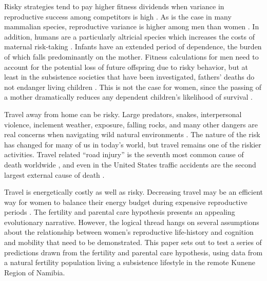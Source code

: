 Risky strategies tend to pay higher fitness dividends when variance in reproductive success among competitors is high \citep{clutton1991sexual, clutton2007sexual, wilson1985competitiveness}.  As is the case in many mammalian species, reproductive variance is higher among men than women \citep{betzig2012means}.  In addition, humans are a particularly altricial species which increases the costs of maternal risk-taking  \citep{campbell1999staying}.  Infants have an extended period of dependence, the burden of which falls predominantly on the mother.  Fitness calculations for men need to account for the potential loss of future offspring due to risky behavior, but at least in the subsistence societies that have been investigated, fathers' deaths do not endanger living children \citep{sear2008keeps}.  This is not the case for women, since the passing of a mother dramatically reduces any dependent children's likelihood of survival \citep{hill1996ache, sear2008keeps}.  


Travel away from home can be risky.  Large predators, snakes, interpersonal violence, inclement weather, exposure, falling rocks, and many other dangers are real concerns when navigating wild natural environments \citep{treves1999risk, pugh1980incidence, walker2001bioarchaeological}.  The nature of the risk has changed for many of us in today's world, but travel remains one of the riskier activities.  Travel related ``road injury'' is the seventh most common cause of death worldwide \citep{krug2000global}, and even in the United States traffic accidents are the second largest external cause of death \citep{sherry2010cdc}.  

Travel is energetically costly as well as risky.  Decreasing travel may be an efficient way for women to balance their energy budget during expensive reproductive periods \citep{dufour2002comparative, ellison2003energetics}.  The fertility and parental care hypothesis presents an appealing evolutionary narrative. However, the logical thread hangs on several assumptions about the relationship between women’s reproductive life-history and cognition and mobility that need to be demonstrated.  This paper sets out to test a series of predictions drawn from the fertility and parental care hypothesis, using data from a natural fertility population living a subsistence lifestyle in the remote Kunene Region of Namibia.

